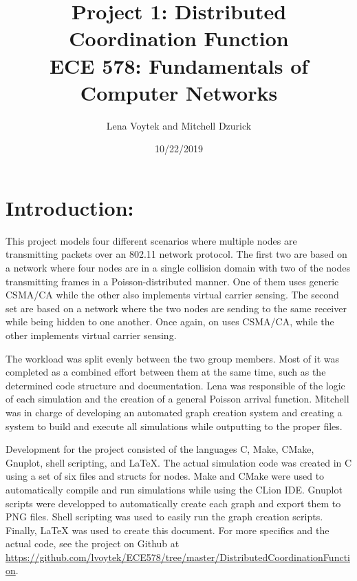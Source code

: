 \documentclass[11pt]{article}
\title {{\bf Project 1: Distributed Coordination Function} \\
\large{ECE 578: Fundamentals of Computer Networks}}
\author{Lena Voytek and Mitchell Dzurick}
\date{10/22/2019}
\begin{document}
\maketitle{}

\section*{Introduction:}

    This project models four different scenarios where multiple nodes are transmitting packets over an 802.11 network protocol. The first two are based on a network where four nodes are in a single collision domain with two of the nodes transmitting frames in a Poisson-distributed manner. One of them uses generic CSMA/CA while the other also implements virtual carrier sensing. The second set are based on a network where the two nodes are sending to the same receiver while being hidden to one another. Once again, on uses CSMA/CA, while the other implements virtual carrier sensing.
    \par
    The workload was split evenly between the two group members. Most of it was completed as a combined effort between them at the same time, such as the determined code structure and documentation. Lena was responsible of the logic of each simulation and the creation of a general Poisson arrival function. Mitchell was in charge of developing an automated graph creation system and creating a system to build and execute all simulations while outputting to the proper files.
    \par
    Development for the project consisted of the languages C, Make, CMake, Gnuplot, shell scripting, and \LaTeX{}. The actual simulation code was created in C using a set of six files and structs for nodes. Make and CMake were used to automatically compile and run simulations while using the CLion IDE. Gnuplot scripts were developped to automatically create each graph and export them to PNG files. Shell scripting was used to easily run the graph creation scripts. Finally, \LaTeX{} was used to create this document. For more specifics and the actual code, see the project on Github at \\
    \textcolor{blue}{ \href{https://github.com/lvoytek/ECE578/tree/master/DistributedCoordinationFunction}{https://github.com/lvoytek/ECE578/tree/master/DistributedCoordinationFunction}}.

\clearpage
\end{document}
